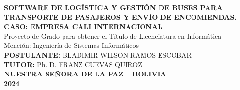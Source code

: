 \begin{titlepage}
\begin{center}
		{\textbf{SOFTWARE DE LOGÍSTICA Y GESTIÓN DE BUSES PARA TRANSPORTE DE PASAJEROS Y ENVÍO DE ENCOMIENDAS. CASO: EMPRESA CALI INTERNACIONAL}}\\
		{Proyecto de Grado para obtener el Título de Licenciatura en Informática}\\
		Mención: Ingeniería de Sistemas Informáticos\\
		
		\textbf{POSTULANTE:} BLADIMIR WILSON RAMOS ESCOBAR\\
		\textbf{TUTOR:} Ph. D. FRANZ CUEVAS QUIROZ\\
		\textbf{NUESTRA SEÑORA DE LA PAZ – BOLIVIA}\\
		\textbf{2024}\\
	\end{center}
\end{titlepage}